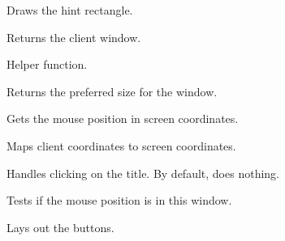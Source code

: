 Draws the hint rectangle.


\label{wxtoolwindowgetclient}


Returns the client window.


\label{wxtoolwindowgetminimalwnddim}


Helper function.


\label{wxtoolwindowgetpreferredsize}


Returns the preferred size for the window.


\label{wxtoolwindowgetscrmousepos}


Gets the mouse position in screen coordinates.


\label{wxtoolwindowgetscrwindowrect}


Maps client coordinates to screen coordinates.


\label{wxtoolwindowhandletitleclick}


Handles clicking on the title. By default, does nothing.


\label{wxtoolwindowhittestwindow}


Tests if the mouse position is in this window.


\label{wxtoolwindowlayoutminibuttons}


Lays out the buttons.


\label{wxtoolwindowonerasebackground}


